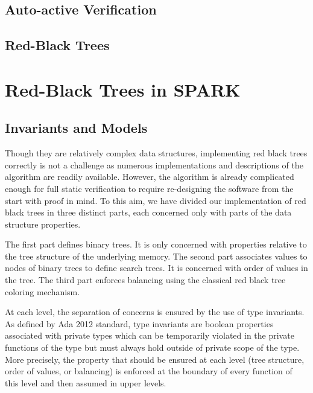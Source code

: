 \documentclass[11pt,a4paper]{article}
\begin{document}
\subsection{Auto-active Verification}
\subsection{Red-Black Trees}

\section{Red-Black Trees in SPARK}
\subsection{Invariants and Models}


Though they are relatively complex data structures, implementing red black trees
correctly is not a challenge as numerous implementations and descriptions of the
algorithm are readily available. However, the algorithm is already complicated
enough for full static verification to require re-designing the
software from the start with proof in mind.
To this aim, we have divided our implementation of red black trees in three
distinct parts, each concerned only with parts of the data structure properties.

The first part defines binary trees. It is only concerned with properties
relative to the tree structure of the underlying memory.
The second part associates values to nodes of binary trees to define search trees.
It is concerned with order of values in the tree.
The third part enforces balancing using the classical red black tree coloring
mechanism.

At each level, the separation of concerns is ensured by the use of type invariants.
As defined by Ada 2012 standard, type invariants are boolean properties associated
with private types which can be temporarily violated in the private functions of the
type but must always hold outside of private scope of the type.
More precisely, the property that should be ensured at each level (tree structure,
order of values, or balancing) is enforced at the boundary of every function
of this level and then assumed in upper levels.
\end{document}
